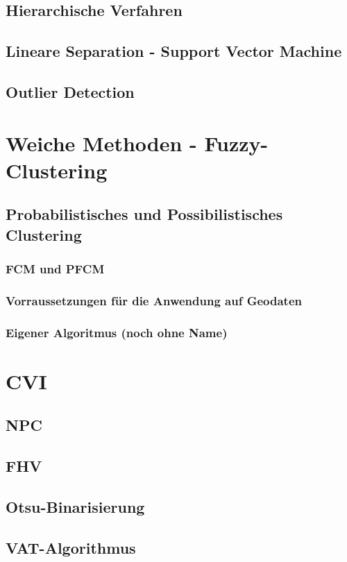 \documentclass[11pt,fleqn]{book}
\begin{document}
\subsection{Hierarchische Verfahren}
\subsection{Lineare Separation - Support Vector Machine}
\subsection{Outlier Detection}


\section{Weiche Methoden - Fuzzy-Clustering}
\subsection{Probabilistisches und Possibilistisches Clustering}
\subsubsection{FCM und PFCM}
\subsubsection{Vorraussetzungen für die Anwendung auf Geodaten}
\subsubsection{Eigener Algoritmus (noch ohne Name)}

\section{CVI}
\subsection{NPC}
\subsection{FHV}
\subsection{Otsu-Binarisierung}
\subsection{VAT-Algorithmus}
\end{document}
